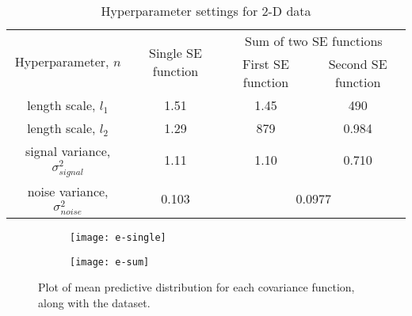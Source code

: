 \documentclass[11pt]{report}
\begin{document}
\begin{table}[ht]
\begin{center}
\begin{tabular}{ |c|c|c|c| }
  \hline
  \multirow{2}{*}{Hyperparameter, $n$} & \multirow{2}{*}{Single SE function} & \multicolumn{2}{|c|}{Sum of two SE functions} \\\cline{3-4}
  &  & First SE function & Second SE function \\
  \hline
  length scale, $l_1$ & 1.51 & 1.45 & 490 \\
  length scale, $l_2$ & 1.29 & 879 & 0.984 \\
  signal variance, $\sigma_{signal}^{2}$ & 1.11 & 1.10 & 0.710 \\ \cline{3-4}
  noise variance, $\sigma_{noise}^{2}$ & 0.103 & \multicolumn{2}{|c|}{0.0977}\\ 
  \hline
\end{tabular}
\end{center}
\caption{\label{tab:hyperparameter-settings-2D}Hyperparameter settings for 2-D data}
\end{table}

\begin{figure}[ht]
\centering
\begin{subfigure}{.5\linewidth}
  \centering
  \texttt{[image: e-single]}
  \caption{\label{fig:part-e-single}}
\end{subfigure}%
\begin{subfigure}{.5\linewidth}
  \centering
  \texttt{[image: e-sum]}
  \caption{\label{fig:part-e-sum}}
\end{subfigure}
\caption{\label{fig:part-e}Plot of mean predictive distribution for each covariance function, along with the dataset.}
\end{figure}

\end{document}
